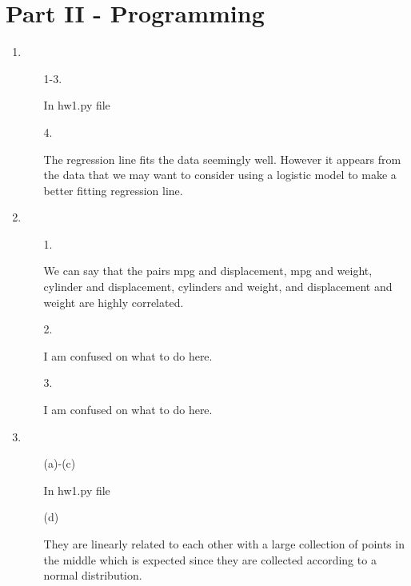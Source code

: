 \documentclass{article}
\begin{document}
\section{Part II - Programming}

\begin{enumerate}
    \item 
    
    \begin{enumerate}
        \item [1-3.]
        
        In hw1.py file
        
        \item [4.]
        
        The regression line fits the data seemingly well. However it appears from the data that we may want to consider using a logistic model to make a better fitting regression line.
        
    \end{enumerate}
    
    \item
    
    \begin{enumerate}
        \item [1.]
        
        We can say that the pairs mpg and displacement, mpg and weight, cylinder and displacement, cylinders and weight, and displacement and weight are highly correlated.
        
        \item [2.]
        
        I am confused on what to do here.
        
        \item [3.]
        
        I am confused on what to do here.
        
    \end{enumerate}
    
    \item
    
    \begin{enumerate}
        \item [(a)-(c)]
        
        In hw1.py file
        
        \item[(d)]
        
        They are linearly related to each other with a large collection of points in the middle which is expected since they are collected according to a normal distribution.
        

\end{enumerate}
\end{enumerate}
\end{document}
